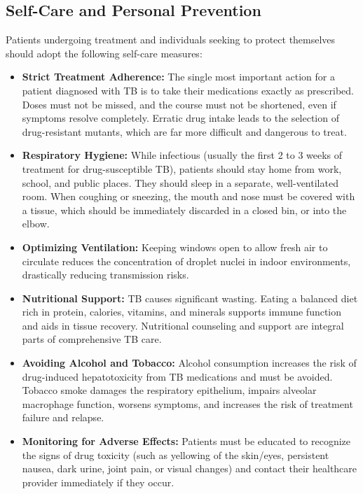\subsection*{Self-Care and Personal Prevention}
Patients undergoing treatment and individuals seeking to protect themselves should adopt the following self-care measures:
\begin{itemize}
    \item \textbf{Strict Treatment Adherence:} The single most important action for a patient diagnosed with TB is to take their medications exactly as prescribed. Doses must not be missed, and the course must not be shortened, even if symptoms resolve completely. Erratic drug intake leads to the selection of drug-resistant mutants, which are far more difficult and dangerous to treat.
    \item \textbf{Respiratory Hygiene:} While infectious (usually the first 2 to 3 weeks of treatment for drug-susceptible TB), patients should stay home from work, school, and public places. They should sleep in a separate, well-ventilated room. When coughing or sneezing, the mouth and nose must be covered with a tissue, which should be immediately discarded in a closed bin, or into the elbow.
    \item \textbf{Optimizing Ventilation:} Keeping windows open to allow fresh air to circulate reduces the concentration of droplet nuclei in indoor environments, drastically reducing transmission risks.
    \item \textbf{Nutritional Support:} TB causes significant wasting. Eating a balanced diet rich in protein, calories, vitamins, and minerals supports immune function and aids in tissue recovery. Nutritional counseling and support are integral parts of comprehensive TB care.
    \item \textbf{Avoiding Alcohol and Tobacco:} Alcohol consumption increases the risk of drug-induced hepatotoxicity from TB medications and must be avoided. Tobacco smoke damages the respiratory epithelium, impairs alveolar macrophage function, worsens symptoms, and increases the risk of treatment failure and relapse.
    \item \textbf{Monitoring for Adverse Effects:} Patients must be educated to recognize the signs of drug toxicity (such as yellowing of the skin/eyes, persistent nausea, dark urine, joint pain, or visual changes) and contact their healthcare provider immediately if they occur.
\end{itemize}

